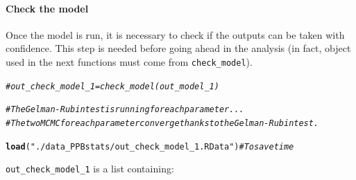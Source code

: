 \documentclass{book}\usepackage[]{graphicx}\usepackage[]{color}
\makeatletter
\newcommand{\hlstr}[1]{\textcolor[rgb]{0.192,0.494,0.8}{#1}}%
\newcommand{\hlcom}[1]{\textcolor[rgb]{0.678,0.584,0.686}{\textit{#1}}}%
\newcommand{\hlstd}[1]{\textcolor[rgb]{0.345,0.345,0.345}{#1}}%
\newcommand{\hlkwd}[1]{\textcolor[rgb]{0.737,0.353,0.396}{\textbf{#1}}}%
\newenvironment{kframe}{%
 \def\at@end@of@kframe{}%
 \ifinner\ifhmode%
  \def\at@end@of@kframe{\end{minipage}}%
  \begin{minipage}{\columnwidth}%
 \fi\fi%
 \def\FrameCommand##1{\hskip\@totalleftmargin \hskip-\fboxsep
 \colorbox{shadecolor}{##1}\hskip-\fboxsep
     \hskip-\linewidth \hskip-\@totalleftmargin \hskip\columnwidth}%
 \MakeFramed {\advance\hsize-\width
   \@totalleftmargin\z@ \linewidth\hsize
   \@setminipage}}%
 {\par\unskip\endMakeFramed%
 \at@end@of@kframe}
\newenvironment{knitrout}{}{} %
\makeatother
\begin{document}
\paragraph{Check the model}

Once the model is run, it is necessary to check if the outputs can be taken with confidence.
This step is needed before going ahead in the analysis (in fact, object used in the next functions must come from \texttt{check\_model}).

\begin{knitrout}
\color{fgcolor}\begin{kframe}
\begin{alltt}
\hlcom{# out_check_model_1 = check_model(out_model_1)}

\hlcom{# The Gelman-Rubin test is running for each parameter ...}
\hlcom{# The two MCMC for each parameter converge thanks to the Gelman-Rubin test.}

\hlkwd{load}\hlstd{(}\hlstr{"./data_PPBstats/out_check_model_1.RData"}\hlstd{)} \hlcom{# To save time}
\end{alltt}
\end{kframe}
\end{knitrout}

\texttt{out\_check\_model\_1} is a list containing:
\end{document}
